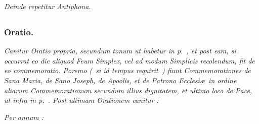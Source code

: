 \documentclass[12pt]{article} %
\newenvironment{rubric}{\vspace{2 mm}\color{benred8} \itshape \leftskip 0in \setlength{\parindent}{0.25in}}{\vspace{2 mm}}
\let\oldVbar\Vbar
\renewcommand{\Vbar}{\textcolor{benred8}{\oldVbar .}}
\begin{document}
\begin{rubric}
Deinde repetitur Antiphona.

\end{rubric}

\subsection*{}

\vspace*{-2.0mm}

\subsubsection*{Oratio.}


\gresetfirstlineaboveinitial{\small \textsc{ \textbf{\textcolor{benred8}{\Vbar}}}}{\small \textsc{ \textbf{\textcolor{benred8}{\Vbar}}}}

\begin{rubric}
Canitur Oratio propria, secundum tonum ut habetur in p.~\pageref{sec:TonusOrationis}, et post eam, si occurrat eo die aliquod Feum Simplex, vel ad modum Simplicis recolendum, fit de eo commemoratio. Poremo (~si id tempus requirit~) fiunt Commemorationes de Sana Maria, de Sano Joseph, de Apoolis, et de Patrono Ecclesi\ae\ in ordine aliarum Commemorationum secundum illius dignitatem, et ultimo loco de Pace, ut infra in p.~\pageref{sec:Commem}. Post ultimam Orationem canitur :

\end{rubric}

\gresetfirstlineaboveinitial{\small \textsc{ \textbf{\textcolor{benred8}{\Vbar}}}}{\small \textsc{ \textbf{\textcolor{benred8}{\Vbar}}}}

\begin{rubric}
Per annum :

\end{rubric}


\gresetfirstlineaboveinitial{\small \textsc{ \textbf{\textcolor{benred8}{I}}}}{\small \textsc{ \textbf{\textcolor{benred8}{I}}}}
\end{document}
